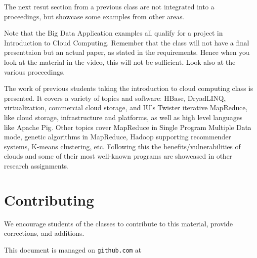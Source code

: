 The next resut section from a previous class are not integrated into a
proceedings, but showcase some examples from other areas. 

\begin{IU}
  Note that the Big Data Application examples all qualify for a
  project in Introduction to Cloud Computing. Remember that the class
  will not have a final presenttaion but an actual paper, as stated
  in the requirements. Hence when you look at the material in the
  video, this will not be sufficient. Look also at the various
  proceedings.
\end{IU}

The work of previous students taking the introduction to cloud
computing class is presented. It covers a variety of topics and
software: HBase, DryadLINQ, virtualization, commercial cloud storage,
and IU's Twister iterative MapReduce, like cloud storage,
infrastructure and platforms, as well as high level languages like
Apache Pig. Other topics cover MapReduce in Single Program Multiple
Data mode, genetic algorithms in MapReduce, Hadoop supporting
recommender systems, K-means clustering, etc. Following this the
benefits/vulnerabilities of clouds and some of their most well-known
programs are showcased in other research assignments.









\section{Contributing}

We encourage students of the classes to contribute to this material,
provide corrections, and additions.

This document is managed on \verb|github.com| at 

